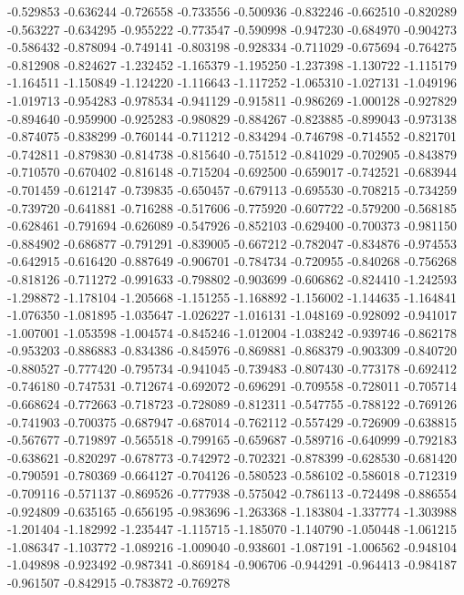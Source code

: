 -0.529853
-0.636244
-0.726558
-0.733556
-0.500936
-0.832246
-0.662510
-0.820289
-0.563227
-0.634295
-0.955222
-0.773547
-0.590998
-0.947230
-0.684970
-0.904273
-0.586432
-0.878094
-0.749141
-0.803198
-0.928334
-0.711029
-0.675694
-0.764275
-0.812908
-0.824627
-1.232452
-1.165379
-1.195250
-1.237398
-1.130722
-1.115179
-1.164511
-1.150849
-1.124220
-1.116643
-1.117252
-1.065310
-1.027131
-1.049196
-1.019713
-0.954283
-0.978534
-0.941129
-0.915811
-0.986269
-1.000128
-0.927829
-0.894640
-0.959900
-0.925283
-0.980829
-0.884267
-0.823885
-0.899043
-0.973138
-0.874075
-0.838299
-0.760144
-0.711212
-0.834294
-0.746798
-0.714552
-0.821701
-0.742811
-0.879830
-0.814738
-0.815640
-0.751512
-0.841029
-0.702905
-0.843879
-0.710570
-0.670402
-0.816148
-0.715204
-0.692500
-0.659017
-0.742521
-0.683944
-0.701459
-0.612147
-0.739835
-0.650457
-0.679113
-0.695530
-0.708215
-0.734259
-0.739720
-0.641881
-0.716288
-0.517606
-0.775920
-0.607722
-0.579200
-0.568185
-0.628461
-0.791694
-0.626089
-0.547926
-0.852103
-0.629400
-0.700373
-0.981150
-0.884902
-0.686877
-0.791291
-0.839005
-0.667212
-0.782047
-0.834876
-0.974553
-0.642915
-0.616420
-0.887649
-0.906701
-0.784734
-0.720955
-0.840268
-0.756268
-0.818126
-0.711272
-0.991633
-0.798802
-0.903699
-0.606862
-0.824410
-1.242593
-1.298872
-1.178104
-1.205668
-1.151255
-1.168892
-1.156002
-1.144635
-1.164841
-1.076350
-1.081895
-1.035647
-1.026227
-1.016131
-1.048169
-0.928092
-0.941017
-1.007001
-1.053598
-1.004574
-0.845246
-1.012004
-1.038242
-0.939746
-0.862178
-0.953203
-0.886883
-0.834386
-0.845976
-0.869881
-0.868379
-0.903309
-0.840720
-0.880527
-0.777420
-0.795734
-0.941045
-0.739483
-0.807430
-0.773178
-0.692412
-0.746180
-0.747531
-0.712674
-0.692072
-0.696291
-0.709558
-0.728011
-0.705714
-0.668624
-0.772663
-0.718723
-0.728089
-0.812311
-0.547755
-0.788122
-0.769126
-0.741903
-0.700375
-0.687947
-0.687014
-0.762112
-0.557429
-0.726909
-0.638815
-0.567677
-0.719897
-0.565518
-0.799165
-0.659687
-0.589716
-0.640999
-0.792183
-0.638621
-0.820297
-0.678773
-0.742972
-0.702321
-0.878399
-0.628530
-0.681420
-0.790591
-0.780369
-0.664127
-0.704126
-0.580523
-0.586102
-0.586018
-0.712319
-0.709116
-0.571137
-0.869526
-0.777938
-0.575042
-0.786113
-0.724498
-0.886554
-0.924809
-0.635165
-0.656195
-0.983696
-1.263368
-1.183804
-1.337774
-1.303988
-1.201404
-1.182992
-1.235447
-1.115715
-1.185070
-1.140790
-1.050448
-1.061215
-1.086347
-1.103772
-1.089216
-1.009040
-0.938601
-1.087191
-1.006562
-0.948104
-1.049898
-0.923492
-0.987341
-0.869184
-0.906706
-0.944291
-0.964413
-0.984187
-0.961507
-0.842915
-0.783872
-0.769278
